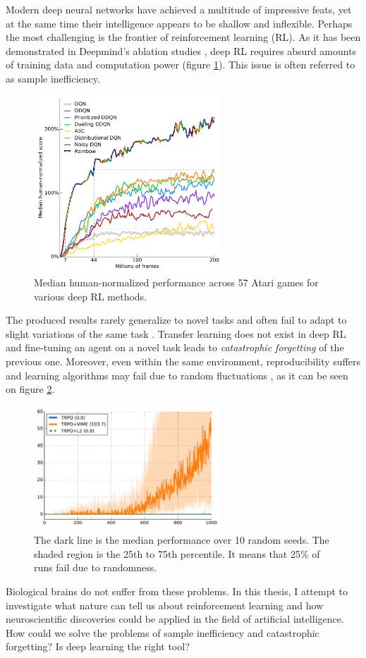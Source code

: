 \documentclass[oneside,english,logo]{amuthesis}
\begin{document}
Modern deep neural networks have achieved a multitude of impressive feats, yet at the same time their intelligence appears to be shallow and inflexible. Perhaps the most challenging is the frontier of reinforcement learning (RL).  As it has been demonstrated in Deepmind's ablation studies \cite{rainbow_dqn}, deep RL requires absurd amounts of training data and computation power (figure \ref{fig:dqn}). This issue is often referred to as sample inefficiency.
\begin{figure}[!htbp]
	\centering
	\includegraphics[width=7cm]{dqn}
	\caption{Median human-normalized performance across
		57 Atari games for various deep RL methods.}
	\label{fig:dqn}
\end{figure} 
The produced results rarely generalize to novel tasks and often fail to adapt to slight variations of the same task \cite{generalisation_in_rl}. Transfer learning does not exist in deep RL and fine-tuning an agent on a novel task leads to \textit{catastrophic forgetting} of the previous one. Moreover, even within the same environment, reproducibility suffers and learning algorithms may fail due to random fluctuations \cite{vime}, as it can be seen on figure \ref{fig:vime}. 
\begin{figure}[!htbp]
	\centering
	\includegraphics[width=7cm]{vime}
	\caption{The dark line is the median performance over 10 random seeds. The shaded region is the 25th to 75th percentile. It means that 25\% of runs fail due to randomness.}
	\label{fig:vime}
\end{figure} 
Biological brains do not suffer from these problems. In this thesis, I attempt to investigate what nature can tell us about reinforcement learning and how neuroscientific discoveries could be applied in the field of artificial intelligence. How could we solve the problems of sample inefficiency and catastrophic forgetting? Is deep learning the right tool?
\end{document}

